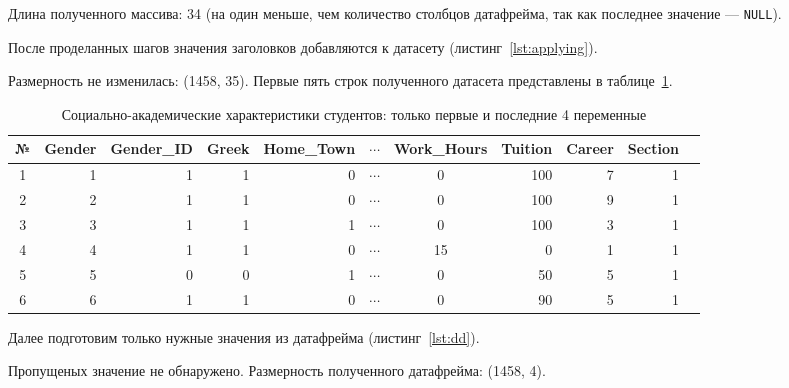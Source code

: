

Длина полученного массива: 34 (на один меньше, чем количество столбцов датафрейма, так как последнее значение — \texttt{NULL}).

После проделанных шагов значения заголовков добавляются к датасету (листинг~\ref{lst:applying}).



Размерность не изменилась: (1458, 35). Первые пять строк полученного датасета представлены в таблице~\ref{tab:students_summary}.

\begin{table}[ht]
	\centering
	\caption{Социально-академические характеристики студентов: только первые и последние 4 переменные}
	\scriptsize
	\setlength{\tabcolsep}{6pt}
	\begin{tabular}{|c|r r r r r c r r r r|}
		\hline
		№ & Gender & Gender\_ID & Greek & Home\_Town & $\cdots$ & Work\_Hours & Tuition & Career & Section \\
		\hline
		1 & 1 & 1 & 1 & 0 & $\cdots$ & 0 & 100 & 7 & 1 \\
		2 & 2 & 1 & 1 & 0 & $\cdots$ & 0 & 100 & 9 & 1 \\
		3 & 3 & 1 & 1 & 1 & $\cdots$ & 0 & 100 & 3 & 1 \\
		4 & 4 & 1 & 1 & 0 & $\cdots$ &15 & 0 & 1 & 1 \\
		5 & 5 & 0 & 0 & 1 & $\cdots$ & 0 & 50 & 5 & 1 \\
		6 & 6 & 1 & 1 & 0 & $\cdots$ & 0 & 90 & 5 & 1 \\
		\hline
	\end{tabular}
	\label{tab:students_summary}
\end{table}

Далее подготовим только нужные значения из датафрейма (листинг~\ref{lst:dd}).


Пропущеных значение не обнаружено. Размерность полученного датафрейма: (1458, 4).

